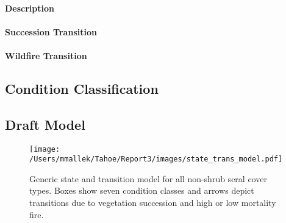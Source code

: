 \paragraph{Description}

\paragraph{Succession Transition}

\paragraph{Wildfire Transition}

\hrulefill

\subsection{Condition Classification}

\subsection{Draft Model}
\begin{figure}[htbp]
\centering
\texttt{[image: /Users/mmallek/Tahoe/Report3/images/state\_trans\_model.pdf]}
\caption{Generic state and transition model for all non-shrub seral cover types. Boxes show seven condition classes and arrows depict transitions due to vegetation succession and high or low mortality fire.} 
\label{transmodel}
\end{figure}


\begin{thebibliography}
\bibitem{} 
\end{thebibliography}

